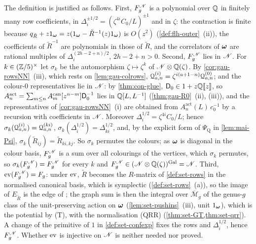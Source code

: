 The definition is justified as follows. First, $F_g^{\mathscr{N}}$ is a polynomial over $\mathbb{Q}$ in finitely many row coefficients, in $\Delta_i^{\pm1/2}=(\zeta^{4i}C_0/L)^{\pm1}$ and in $\zeta$: the contraction is finite because $q_{\tilde R}+z1_{\boldsymbol{\omega}}=z(1_{\boldsymbol{\omega}}-\tilde R^{-1}(z)1_{\boldsymbol{\omega}})$ is $O(z^2)$ (\cref{def:flh-outer}~(ii)), the coefficients of $\tilde R^{-1}$ are polynomials in those of $\tilde R$, and the correlators of $\boldsymbol{\omega}$ are rational multiples of $\Delta_i^{(2h-2+n)/2}$, $2h-2+n>0$. Second, $F_g^{\mathscr{N}}$ lies in $\mathscr{N}$. For $k\in(\mathbb{Z}/5)^\times$ let $\sigma_k$ be the automorphism $\zeta\mapsto\zeta^k$ of $\mathscr{N}\otimes\mathbb{Q}(\zeta)$. By \cref{cor:gau-rowsNN}~(iii), which rests on \cref{lem:gau-colrows}, $\mathcal{Q}^{(i)}_{a,n}=\zeta^{i(a+1-n)}\mathcal{Q}^{(0)}_{a,n}$; and the colour-$0$ representatives lie in $\mathscr{N}$: by \cref{thm:con-glue}, $\mathsf{D}_0\in1+z\mathbb{Q}[\![ z ]\!]$, so $A^{\mathrm{act}}_n=\sum_{m\leq n}A^{\mathrm{can}}_m[z^{n-m}]\mathsf{D}_0^{-1}$ lies in $\mathbb{Q}[L,L^{-1}]$ (\cref{thm:gau-R0}~(ii), (iii)), and the representatives of \cref{cor:gau-rowsNN}~(i) are obtained from $A^{\mathrm{act}}_n(L)\,c_0^{-1}$ by a recursion with coefficients in $\mathscr{N}$. Moreover $\Delta_i^{1/2}=\zeta^{4i}C_0/L$; hence $\sigma_k(\mathcal{Q}^{(i)}_{a,n})=\mathcal{Q}^{(ki)}_{a,n}$, $\sigma_k(\Delta_i^{1/2})=\Delta_{ki}^{1/2}$, and, by the explicit form of $\Psi_{\mathrm Q}$ in \cref{lem:mai-Psi}, $\sigma_k(\tilde R_{ij})=\tilde R_{ki,kj}$. So $\sigma_k$ permutes the colours; as $\boldsymbol{\omega}$ is diagonal in the colour basis, $F_g^{\mathscr{N}}$ is a sum over all colourings of the vertices, which $\sigma_k$ permutes, so $\sigma_k(F_g^{\mathscr{N}})=F_g^{\mathscr{N}}$ for every $k$ and $F_g^{\mathscr{N}}\in(\mathscr{N}\otimes\mathbb{Q}(\zeta))^{\mathrm{Gal}}=\mathscr{N}$. Third, $\operatorname{ev}(F_g^{\mathscr{N}})=F_g$: under $\operatorname{ev}$, $\tilde R$ becomes the $R$-matrix of \cref{def:set-rows} in the normalised canonical basis, which is symplectic (\cref{def:set-rows}~(a)), so the image of $E_{\tilde R}$ is the edge of \cite[Def.~2.2]{PPZ15}; the graph sum is then the integral over $\overline{\mathcal M}_g$ of the genus-$g$ class of the unit-preserving action on $\boldsymbol{\omega}$ (\cref{lem:set-pushins}~(iii), unit $1_{\boldsymbol{\omega}}$), which is the potential by (T), with the normalisation (QRR) (\cref{thm:set-GT,thm:set-qrr}). A change of the primitive of $1$ in \cref{def:set-confexp} fixes the rows and $\Delta_i^{1/2}$, hence $F_g^{\mathscr{N}}$. Whether $\operatorname{ev}$ is injective on $\mathscr{N}$ is neither needed nor proved.


